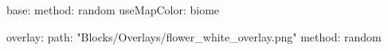 base:
  method: random
  useMapColor: biome
  
overlay:
  path: "Blocks/Overlays/flower_white_overlay.png"
  method: random